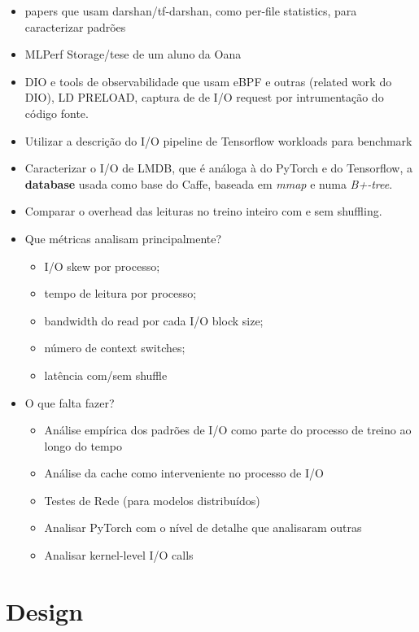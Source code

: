 \documentclass[conference]{IEEEtran}
\begin{document}
\begin{itemize}
    \item papers que usam darshan/tf-darshan, como per-file statistics, para caracterizar padrões \cite{9229605} \cite{zoomin} 
    \item MLPerf Storage/tese de um aluno da Oana
    \item DIO e tools de observabilidade que usam eBPF e outras (related work do DIO), LD PRELOAD, captura de de I/O request por intrumentação do código fonte.
    \item Utilizar a descrição do I/O pipeline de Tensorflow workloads para benchmark \cite{8638422}
    \item Caracterizar o I/O de LMDB, que é análoga à do PyTorch e do Tensorflow, a \textbf{database} usada como base do Caffe, baseada em \textit{mmap} e numa \textit{B+-tree}. \cite{LMDB}
    \item Comparar o overhead das leituras no treino inteiro com e sem shuffling. \cite{initial}
    \item Que métricas analisam principalmente?
    \begin{itemize}
        \item I/O skew por processo;
        \item tempo de leitura por processo;
        \item bandwidth do read por cada I/O block size;
        \item número de context switches;
        \item latência com/sem shuffle
    \end{itemize} 
    \item O que falta fazer?
    \begin{itemize}
        \item Análise empírica dos padrões de I/O como parte do processo de treino ao longo do tempo
        \item Análise da cache como interveniente no processo de I/O
        \item Testes de Rede (para modelos distribuídos)
        \item Analisar PyTorch com o nível de detalhe que analisaram outras
        \item Analisar kernel-level I/O calls 
    \end{itemize}
\end{itemize}

\section{Design}
\end{document}
